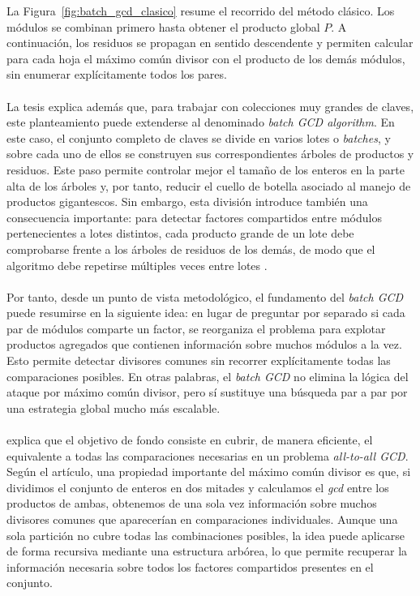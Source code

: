 La Figura~\ref{fig:batch_gcd_clasico} resume el recorrido del método clásico.
Los módulos se combinan primero hasta obtener el producto global \(P\). A
continuación, los residuos se propagan en sentido descendente y permiten
calcular para cada hoja el máximo común divisor con el producto de los demás
módulos, sin enumerar explícitamente todos los pares.
\\
\\
La tesis explica además que, para trabajar con colecciones muy grandes de claves, este planteamiento puede extenderse al denominado \textit{batch GCD algorithm}. En este caso, el conjunto completo de claves se divide en varios lotes o \textit{batches}, y sobre cada uno de ellos se construyen sus correspondientes árboles de productos y residuos. Este paso permite controlar mejor el tamaño de los enteros en la parte alta de los árboles y, por tanto, reducir el cuello de botella asociado al manejo de productos gigantescos. Sin embargo, esta división introduce también una consecuencia importante: para detectar factores compartidos entre módulos pertenecientes a lotes distintos, cada producto grande de un lote debe comprobarse frente a los árboles de residuos de los demás, de modo que el algoritmo debe repetirse múltiples veces entre lotes \citep{vage2022finding}.
\\
\\
Por tanto, desde un punto de vista metodológico, el fundamento del \textit{batch GCD} puede resumirse en la siguiente idea: en lugar de preguntar por separado si cada par de módulos comparte un factor, se reorganiza el problema para explotar productos agregados que contienen información sobre muchos módulos a la vez. Esto permite detectar divisores comunes sin recorrer explícitamente todas las comparaciones posibles. En otras palabras, el \textit{batch GCD} no elimina la lógica del ataque por máximo común divisor, pero sí sustituye una búsqueda par a par por una estrategia global mucho más escalable.
\\
\\
\citet{pelofske2024efficient} explica que el objetivo de fondo consiste en cubrir, de manera eficiente, el equivalente a todas las comparaciones necesarias en un problema \textit{all-to-all GCD}. Según el artículo, una propiedad importante del máximo común divisor es que, si dividimos el conjunto de enteros en dos mitades y calculamos el \textit{gcd} entre los productos de ambas, obtenemos de una sola vez información sobre muchos divisores comunes que aparecerían en comparaciones individuales. Aunque una sola partición no cubre todas las combinaciones posibles, la idea puede aplicarse de forma recursiva mediante una estructura arbórea, lo que permite recuperar la información necesaria sobre todos los factores compartidos presentes en el conjunto.
